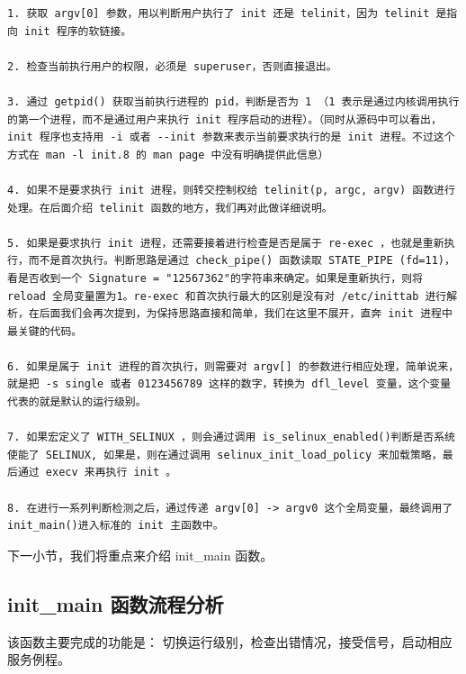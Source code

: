 {\begin{shaded}\begin{verbatim}
1. 获取 argv[0] 参数，用以判断用户执行了 init 还是 telinit，因为 telinit 是指向 init 程序的软链接。

2. 检查当前执行用户的权限，必须是 superuser，否则直接退出。

3. 通过 getpid() 获取当前执行进程的 pid，判断是否为 1 （1 表示是通过内核调用执行的第一个进程，而不是通过用户来执行 init 程序启动的进程）。（同时从源码中可以看出，init 程序也支持用 -i 或者 --init 参数来表示当前要求执行的是 init 进程。不过这个方式在 man -l init.8 的 man page 中没有明确提供此信息）

4. 如果不是要求执行 init 进程，则转交控制权给 telinit(p, argc, argv) 函数进行处理。在后面介绍 telinit 函数的地方，我们再对此做详细说明。

5. 如果是要求执行 init 进程，还需要接着进行检查是否是属于 re-exec ，也就是重新执行，而不是首次执行。判断思路是通过 check_pipe() 函数读取 STATE_PIPE (fd=11)，看是否收到一个 Signature = "12567362"的字符串来确定。如果是重新执行，则将 reload 全局变量置为1。re-exec 和首次执行最大的区别是没有对 /etc/inittab 进行解析，在后面我们会再次提到，为保持思路直接和简单，我们在这里不展开，直奔 init 进程中最关键的代码。

6. 如果是属于 init 进程的首次执行，则需要对 argv[] 的参数进行相应处理，简单说来，就是把 -s single 或者 0123456789 这样的数字，转换为 dfl_level 变量，这个变量代表的就是默认的运行级别。

7. 如果宏定义了 WITH_SELINUX ，则会通过调用 is_selinux_enabled()判断是否系统使能了 SELINUX, 如果是，则在通过调用 selinux_init_load_policy 来加载策略，最后通过 execv 来再执行 init 。

8. 在进行一系列判断检测之后，通过传递 argv[0] -> argv0 这个全局变量，最终调用了 init_main()进入标准的 init 主函数中。
\end{verbatim}\end{shaded}}
下一小节，我们将重点来介绍 init\_main 函数。

\subsection{init\_main 函数流程分析}

该函数主要完成的功能是：
切换运行级别，检查出错情况，接受信号，启动相应服务例程。

